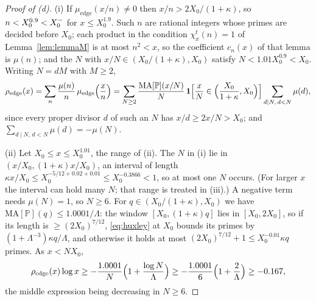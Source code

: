 \begin{proof}[Proof of (d)]
(i) If $\mu_{\mathrm{edge}}(x/n)\ne0$ then $x/n>2X_0/(1+\kappa)$, so $n<X_0^{0.9}<X_0^{-}$ for $x\le X_0^{1.9}$. Such $n$ are rational
integers whose primes are decided before $X_0$; each product in the condition $\chi^t_x(n)=1$ of Lemma~\ref{lem:lemmaM} is at most
$n^2<x$, so the coefficient $c_n(x)$ of that lemma is $\mu(n)$; and the $N$ with
$x/N\in(X_0/(1+\kappa),X_0)$ satisfy $N<1.01X_0^{0.9}<X_0$. Writing $N=dM$ with $M\ge2$,
\[
  \rho_{\mathrm{edge}}(x)=\sum_n\frac{\mu(n)}n\,\mu_{\mathrm{edge}}\Bigl(\frac xn\Bigr)=\sum_{N\ge2}\frac{\mathrm{MA}[\mathbb P](x/N)}N\,
  \mathbf 1\Bigl[\frac xN\in\Bigl(\frac{X_0}{1+\kappa},X_0\Bigr)\Bigr]\sum_{d\mid N,\,d<N}\mu(d),
\]
since every proper divisor $d$ of such an $N$ has $x/d\ge2x/N>X_0$; and $\sum_{d\mid N,\,d<N}\mu(d)=-\mu(N)$.

(ii)
Let $X_0\le x\le X_0^{1.01}$, the range of (ii). The $N$ in (i) lie in $(x/X_0,(1+\kappa)x/X_0)$, an interval of length
$\kappa x/X_0\le X_0^{-5/12+0.02+0.01}\le X_0^{-0.3866}<1$, so at most one $N$ occurs. (For larger $x$ the interval can hold many
$N$; that range is treated in (iii).) A negative term needs
$\mu(N)=1$, so $N\ge6$. For $q\in(X_0/(1+\kappa),X_0)$ we have $\mathrm{MA}[\mathbb P](q)\le1.0001/\Lambda$: the window
$[X_0,(1+\kappa)q]$ lies in $[X_0,2X_0]$, so if its length is $\ge(2X_0)^{7/12}$, \eqref{eq:huxley} at $X_0$ bounds its primes by
$(1+\Lambda^{-3})\kappa q/\Lambda$, and otherwise it holds at most $(2X_0)^{7/12}+1\le X_0^{-0.01}\kappa q$ primes. As $x<NX_0$,
\[
  \rho_{\mathrm{edge}}(x)\log x\ge-\frac{1.0001}{N}\Bigl(1+\frac{\log N}\Lambda\Bigr)\ge-\frac{1.0001}6\Bigl(1+\frac2\Lambda\Bigr)\ge-0.167,
\]
the middle expression being decreasing in $N\ge6$.


\end{proof}
